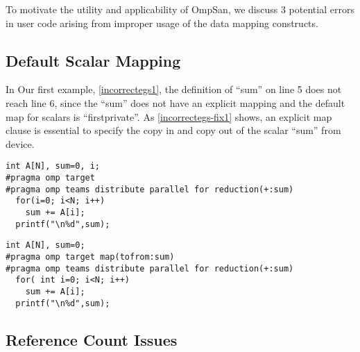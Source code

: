 To motivate the utility and applicability of OmpSan,
we discuss 3 potential errors in user code arising from 
improper usage of the data mapping constructs.

\vspace{-10pt}
\subsection{Default Scalar Mapping}
In Our first example, \autoref{incorrectegs1},  
 the definition of ``sum'' on line 5 does not reach line 6,
since the ``sum'' does not have an explicit mapping and the default
map for scalars is ``firstprivate''. 
As \autoref{incorrectegs-fix1} shows, an explicit map clause 
is essential to specify the 
copy in and copy out of the scalar ``sum'' from device.

\begin{minipage}{.4\textwidth}
\begin{lstlisting}[style=customc, frame=tlrb, caption={Default scalar map}, label=incorrectegs1]
int A[N], sum=0, i;
#pragma omp target
#pragma omp teams distribute parallel for reduction(+:sum)
  for(i=0; i<N; i++) 
    sum += A[i];
  printf("\n%d",sum);
\end{lstlisting}
\end{minipage}\hfil
\begin{minipage}{.4\textwidth}
\begin{lstlisting}[style=customc, frame=tlrb, caption={Explicit map}, label=incorrectegs-fix1]
int A[N], sum=0;
#pragma omp target map(tofrom:sum)
#pragma omp teams distribute parallel for reduction(+:sum)
  for( int i=0; i<N; i++) 
    sum += A[i];
  printf("\n%d",sum);
\end{lstlisting}
\end{minipage}

\subsection{Reference Count Issues}
